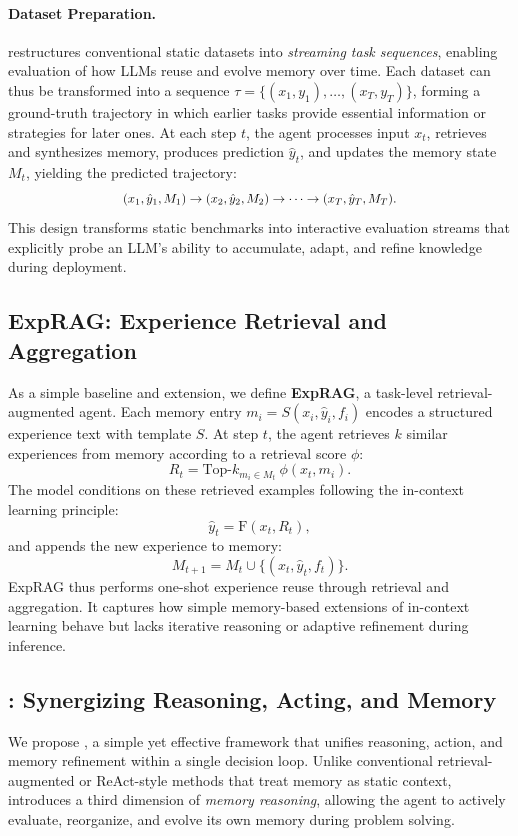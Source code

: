 \paragraph{Dataset Preparation.}  
\method restructures conventional static datasets into \emph{streaming task sequences}, enabling evaluation of how LLMs reuse and evolve memory over time.  
Each dataset can thus be transformed into a sequence $\tau = \{(x_1, y_1), \dots, (x_T, y_T)\}$, forming a ground-truth trajectory in which earlier tasks provide essential information or strategies for later ones.  
At each step $t$, the agent processes input $x_t$, retrieves and synthesizes memory, produces prediction $\hat{y}_t$, and updates the memory state $M_t$, yielding the predicted trajectory:
\[
\scalebox{0.9}{$
(x_1, \hat{y}_1, M_1) \rightarrow (x_2, \hat{y}_2, M_2) \rightarrow \cdots \rightarrow (x_T, \hat{y}_T, M_T).
$}
\]
This design transforms static benchmarks into interactive evaluation streams that explicitly probe an LLM’s ability to accumulate, adapt, and refine knowledge during deployment.



\subsection{\protect\textbf{ExpRAG}: Experience Retrieval and Aggregation}

As a simple baseline and extension, we define \textbf{ExpRAG}, a task-level retrieval-augmented agent. Each memory entry $m_i = S(x_i, \hat{y}_i, f_i)$ encodes a structured experience text with template $S$.
At step $t$, the agent retrieves $k$ similar experiences from memory according to a retrieval score $\phi$:
\[
R_t = \text{Top-}k_{m_i \in M_t}~\phi(x_t, m_i).
\]
The model conditions on these retrieved examples following the in-context learning principle:
\[
\hat{y}_t = \text{F}(x_t, R_t),
\]
and appends the new experience to memory:
\[
M_{t+1} = M_t \cup \{(x_t, \hat{y}_t, f_t)\}.
\]
ExpRAG thus performs one-shot experience reuse through retrieval and aggregation. It captures how simple memory-based extensions of in-context learning behave but lacks iterative reasoning or adaptive refinement during inference.

\subsection{\protect\alg: Synergizing Reasoning, Acting, and Memory}

We propose \textbf{\alg}, a simple yet effective framework that unifies reasoning, action, and memory refinement within a single decision loop.
Unlike conventional retrieval-augmented or ReAct-style methods that treat memory as static context, \alg introduces a third dimension of \emph{memory reasoning}, allowing the agent to actively evaluate, reorganize, and evolve its own memory during problem solving.

